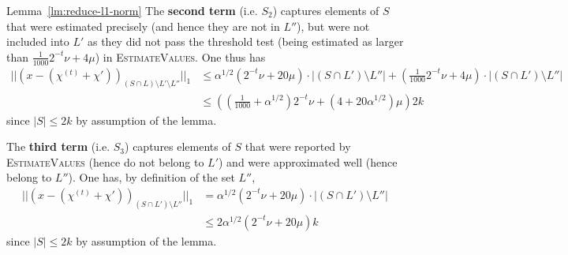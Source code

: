 \begin{proofof}{Lemma~\ref{lm:reduce-l1-norm}}
The {\bf second term} (i.e. $S_2$) captures elements of $S$ that were estimated precisely (and hence they are not in $L''$), but were not included into $L'$ as they did not pass the threshold test (being estimated as larger than $\frac1{1000}2^{-t}\nu+4\mu$)  in \textsc{EstimateValues}. One thus has
\begin{equation}\label{eq:l2p}
\begin{split}
||(x-(\chi^{(t)}+\chi'))_{(S\cap L)\setminus L'\setminus L''}||_1&\leq \alpha^{1/2}(2^{-t}\nu+20\mu)\cdot |(S\cap L')\setminus L''|+(\frac1{1000} 2^{-t}\nu+4\mu)\cdot |(S\cap L')\setminus L''|\\
& \leq ((\frac{1}{1000}+\alpha^{1/2})2^{-t}\nu+(4+20\alpha^{1/2})\mu)2k
\end{split}
\end{equation}
since $|S|\leq 2k$ by assumption of the lemma. 


The {\bf third term} (i.e. $S_3$) captures elements of $S$ that were reported by \textsc{EstimateValues} (hence do not belong to $L'$) and were approximated well (hence belong to $L''$). One has, by definition of the set $L''$,
\begin{equation}\label{eq:23grgerg}
\begin{split}
||(x-(\chi^{(t)}+\chi'))_{(S\cap L')\setminus L''}||_1&=\alpha^{1/2}(2^{-t}\nu+20\mu)\cdot |(S\cap L')\setminus L''|\\
& \leq 2\alpha^{1/2}(2^{-t}\nu+20\mu)k
\end{split}
\end{equation}
since $|S|\leq 2k$ by assumption of the lemma.


\end{proofof}
